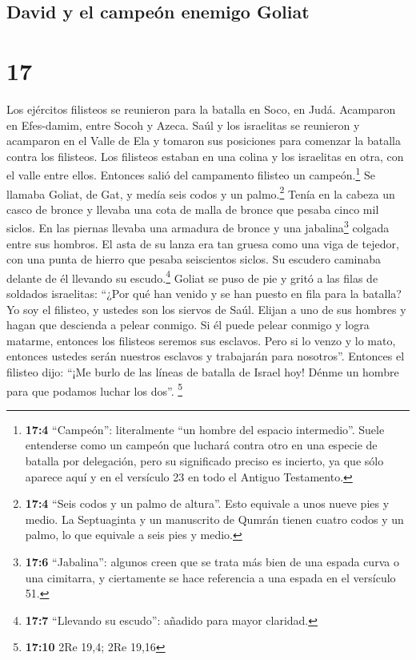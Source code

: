 \hypertarget{david-y-el-campeuxf3n-enemigo-goliat}{%
\subsection{David y el campeón enemigo
Goliat}\label{david-y-el-campeuxf3n-enemigo-goliat}}

\hypertarget{section-16}{%
\section{17}\label{section-16}}

 Los ejércitos filisteos se reunieron para la batalla en
Soco, en Judá. Acamparon en Efes-damim, entre Socoh y Azeca.
 Saúl y los israelitas se reunieron y acamparon en el
Valle de Ela y tomaron sus posiciones para comenzar la batalla contra
los filisteos.  Los filisteos estaban en una colina y los
israelitas en otra, con el valle entre ellos.  Entonces
salió del campamento filisteo un campeón.\footnote{\textbf{17:4}
  ``Campeón'': literalmente ``un hombre del espacio intermedio''. Suele
  entenderse como un campeón que luchará contra otro en una especie de
  batalla por delegación, pero su significado preciso es incierto, ya
  que sólo aparece aquí y en el versículo 23 en todo el Antiguo
  Testamento.} Se llamaba Goliat, de Gat, y medía seis codos y un
palmo.\footnote{\textbf{17:4} ``Seis codos y un palmo de altura''. Esto
  equivale a unos nueve pies y medio. La Septuaginta y un manuscrito de
  Qumrán tienen cuatro codos y un palmo, lo que equivale a seis pies y
  medio.}  Tenía en la cabeza un casco de bronce y llevaba
una cota de malla de bronce que pesaba cinco mil siclos. 
En las piernas llevaba una armadura de bronce y una jabalina\footnote{\textbf{17:6}
  ``Jabalina'': algunos creen que se trata más bien de una espada curva
  o una cimitarra, y ciertamente se hace referencia a una espada en el
  versículo 51.} colgada entre sus hombros.  El asta de su
lanza era tan gruesa como una viga de tejedor, con una punta de hierro
que pesaba seiscientos siclos. Su escudero caminaba delante de él
llevando su escudo.\footnote{\textbf{17:7} ``Llevando su escudo'':
  añadido para mayor claridad.}  Goliat se puso de pie y
gritó a las filas de soldados israelitas: ``¿Por qué han venido y se han
puesto en fila para la batalla? Yo soy el filisteo, y ustedes son los
siervos de Saúl. Elijan a uno de sus hombres y hagan que descienda a
pelear conmigo.  Si él puede pelear conmigo y logra
matarme, entonces los filisteos seremos sus esclavos. Pero si lo venzo y
lo mato, entonces ustedes serán nuestros esclavos y trabajarán para
nosotros''.  Entonces el filisteo dijo: ``¡Me burlo de
las líneas de batalla de Israel hoy! Dénme un hombre para que podamos
luchar los dos''. \footnote{\textbf{17:10} 2Re 19,4; 2Re 19,16}


